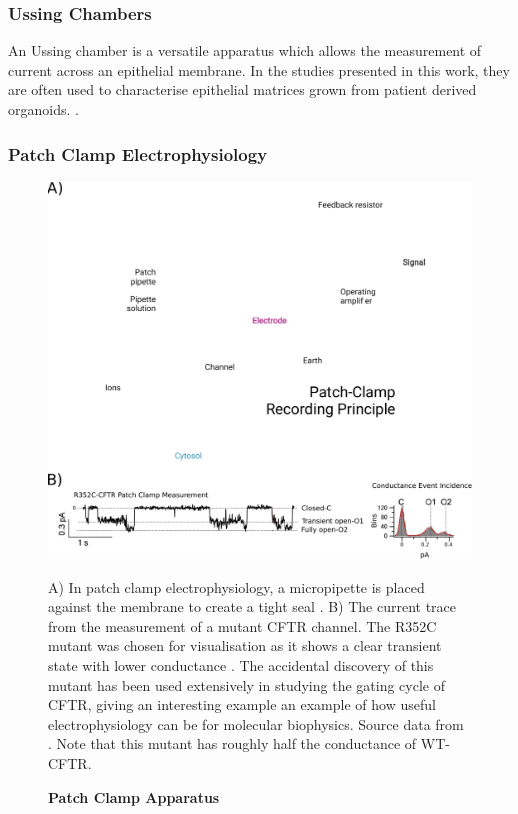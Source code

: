 \subsubsection{Ussing Chambers}
An Ussing chamber is a versatile apparatus which allows the measurement of current across an epithelial membrane. In the studies presented in this work, they are often used to characterise epithelial matrices grown from patient derived organoids. .

\subsubsection{Patch Clamp Electrophysiology}
\begin{figure}
	\label{patch_clamp}
	\begin{center}
	\includegraphics[width=1\textwidth]{figures/R352C_ephys_measurement_figure.pdf}
	\end{center}
	\captionsetup{singlelinecheck = false, justification=raggedright}
	\caption[Patch Clamp Apparatus] {\textbf{Patch Clamp Apparatus}}{A) In patch clamp electrophysiology, a micropipette is placed against the membrane to create a tight seal \cite{patch_clamp_recording_principal_figure}. B) The current trace from the measurement of a mutant CFTR channel. The R352C mutant was chosen for visualisation as it shows a clear transient state with lower conductance \cite{jih2012}. The accidental discovery of this mutant has been used extensively in studying the gating cycle of CFTR, giving an interesting example an example of how useful electrophysiology can be for molecular biophysics. Source data from \cite{jih2012}. Note that this mutant has roughly half the conductance of WT-CFTR.} 
\end{figure}
